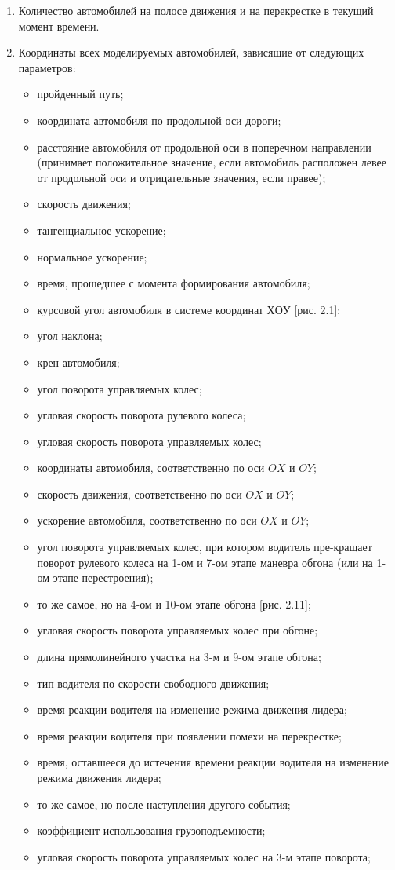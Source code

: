\documentclass[a4paper,14pt]{article}
\begin{document}
\begin{enumerate}
\item Количество автомобилей на полосе движения и на перекрестке в текущий момент времени.
\item Координаты всех моделируемых автомобилей, зависящие от следующих параметров:

\begin{itemize}
\item пройденный путь;
\item координата автомобиля по продольной оси дороги;
\item расстояние автомобиля от продольной оси в поперечном направлении (принимает положительное значение, если автомобиль расположен левее от продольной оси и отрицательные значения, если правее);
\item скорость движения;
\item тангенциальное ускорение;
\item нормальное ускорение;
\item время, прошедшее с момента формирования автомобиля;
\item курсовой угол автомобиля в системе координат $ХОУ$ [рис. 2.1];
\item угол наклона;
\item крен автомобиля;
\item угол поворота управляемых колес;
\item угловая скорость поворота рулевого колеса;
\item угловая скорость поворота управляемых колес;
\item координаты автомобиля, соответственно по оси $OX$ и $OY$;
\item скорость движения, соответственно по оси $OX$ и $OY$;
\item ускорение автомобиля, соответственно по оси $OX$ и $OY$;
\item угол поворота управляемых колес, при котором водитель пре-кращает поворот рулевого колеса на 1-ом и 7-ом этапе маневра обгона (или на 1-ом этапе перестроения);
\item то же самое, но на 4-ом и 10-ом этапе обгона [рис. 2.11];
\item угловая скорость поворота управляемых колес при обгоне;
\item длина прямолинейного участка на 3-м и 9-ом этапе обгона;
\item тип водителя по скорости свободного движения;
\item время реакции водителя на изменение режима движения лидера;
\item время реакции водителя при появлении помехи на перекрестке;
\item время, оставшееся до истечения времени реакции водителя на изменение режима движения лидера;
\item то же самое, но после наступления другого события;
\item коэффициент использования грузоподъемности;
\item угловая скорость поворота управляемых колес на 3-м этапе поворота;


\end{itemize}
\end{enumerate}
\end{document}
